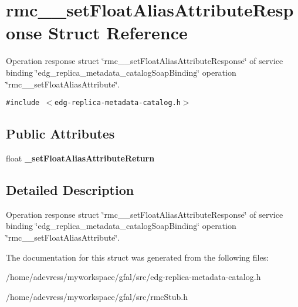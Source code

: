 \section{rmc\_\-\_\-set\-Float\-Alias\-Attribute\-Response Struct Reference}
\label{structrmc____setFloatAliasAttributeResponse}
Operation response struct \char`\"{}rmc\_\-\_\-set\-Float\-Alias\-Attribute\-Response\char`\"{} of service binding \char`\"{}edg\_\-replica\_\-metadata\_\-catalog\-Soap\-Binding\char`\"{} operation \char`\"{}rmc\_\-\_\-set\-Float\-Alias\-Attribute\char`\"{}.  


{\tt \#include $<$edg-replica-metadata-catalog.h$>$}

\subsection*{Public Attributes}
\begin{CompactItemize}
\item 
float \textbf{\_\-set\-Float\-Alias\-Attribute\-Return}\label{structrmc____setFloatAliasAttributeResponse_6eed0542f003a8063d13c327241a7126}

\end{CompactItemize}


\subsection{Detailed Description}
Operation response struct \char`\"{}rmc\_\-\_\-set\-Float\-Alias\-Attribute\-Response\char`\"{} of service binding \char`\"{}edg\_\-replica\_\-metadata\_\-catalog\-Soap\-Binding\char`\"{} operation \char`\"{}rmc\_\-\_\-set\-Float\-Alias\-Attribute\char`\"{}. 



The documentation for this struct was generated from the following files:\begin{CompactItemize}
\item 
/home/adevress/myworkspace/gfal/src/edg-replica-metadata-catalog.h\item 
/home/adevress/myworkspace/gfal/src/rmc\-Stub.h\end{CompactItemize}
